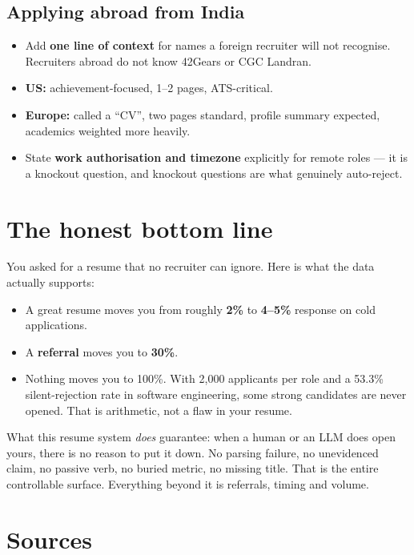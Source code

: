 \documentclass[11pt,a4paper]{article}
\begin{document}
\subsection{Applying abroad from India}
\begin{itemize}
  \item Add \textbf{one line of context} for names a foreign recruiter will not recognise.
        Recruiters abroad do not know 42Gears or CGC Landran.
  \item \textbf{US:} achievement-focused, 1--2 pages, ATS-critical.
  \item \textbf{Europe:} called a ``CV'', two pages standard, profile summary expected,
        academics weighted more heavily.
  \item State \textbf{work authorisation and timezone} explicitly for remote roles --- it is a
        knockout question, and knockout questions are what genuinely auto-reject.
\end{itemize}

\section{The honest bottom line}

You asked for a resume that no recruiter can ignore. Here is what the data actually supports:

\begin{itemize}
  \item A great resume moves you from roughly \textbf{2\%} to \textbf{4--5\%} response on cold
        applications.
  \item A \textbf{referral} moves you to \textbf{30\%}.
  \item Nothing moves you to 100\%. With 2{,}000 applicants per role and a 53.3\%
        silent-rejection rate in software engineering, some strong candidates are never
        opened. That is arithmetic, not a flaw in your resume.
\end{itemize}

What this resume system \emph{does} guarantee: when a human or an LLM does open yours, there
is no reason to put it down. No parsing failure, no unevidenced claim, no passive verb, no
buried metric, no missing title. That is the entire controllable surface. Everything beyond
it is referrals, timing and volume.

\section{Sources}
\end{document}
